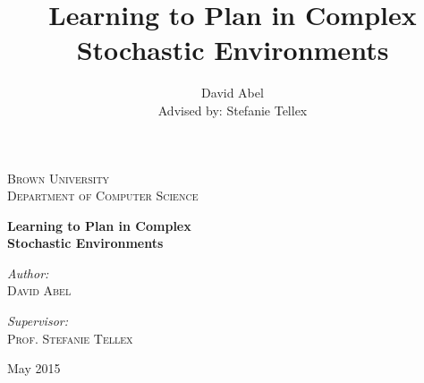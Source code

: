 \documentclass[11pt]{article}
\title{Learning to Plan in Complex Stochastic Environments}
\author{David Abel \\ Advised by: Stefanie Tellex}
\date{}
\begin{document}
\begin{titlepage}
\begin{center}
\vfill
\textsc{\Large Brown University \\ Department of Computer Science}\\[1.5cm]

\vspace{55mm}

{ \huge \bfseries Learning to Plan in Complex  \\Stochastic Environments \\[0.9cm] }

\noindent
\begin{minipage}[t]{0.4\textwidth}
\begin{flushleft} \large
\emph{Author:}\\
\textsc{David Abel}
\end{flushleft}
\end{minipage}%
\begin{minipage}[t]{0.4\textwidth}
\begin{flushright} \large
\emph{Supervisor:} \\
\textsc{Prof. Stefanie Tellex}
\end{flushright}
\end{minipage}


\vfill
{\large May 2015}

\end{center}
\end{titlepage}

\newpage
\end{document}
